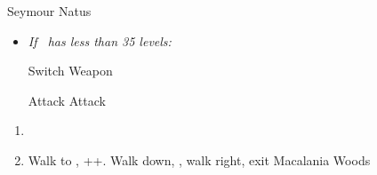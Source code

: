 \bothvfill
\begin{battle}[36000]{Seymour Natus}
	\begin{itemize}
		\item \textit{If \lulu\ has less than 35 levels:}
		      \begin{itemize}
			      \switch{\tidus}{\lulu}
			      \luluf Switch Weapon
			      \switch{\lulu}{\tidus}
		      \end{itemize}
		      \tidusf Attack
		      \summon{\bahamut}
		      \bahamutf Attack
	\end{itemize}
\end{battle}
\begin{enumerate}[resume]
	\item \sd
	\item Walk to \yuna, \cs[6:00]+\skippablefmv+\cs[2:30]. Walk down, \cs[1:40], walk right, exit Macalania Woods
\end{enumerate}